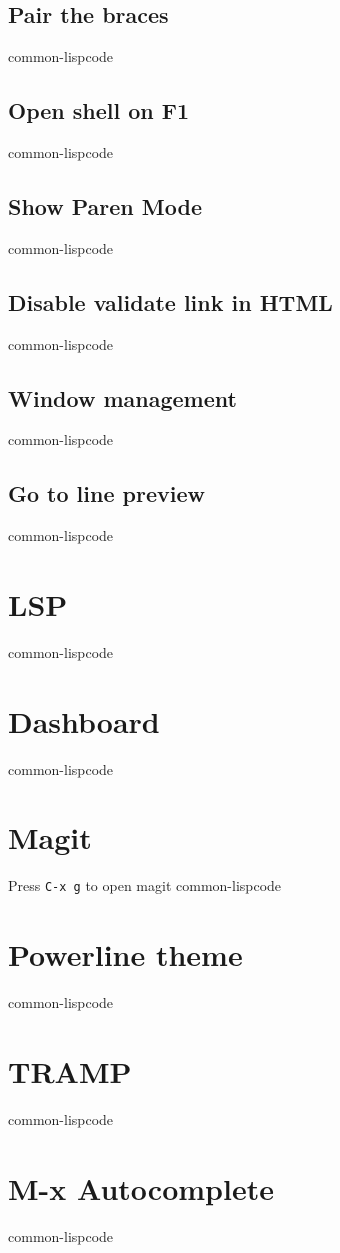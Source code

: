 \documentclass[11pt]{article}
\begin{document}
\subsection{Pair the braces}
\label{sec:orgb76506e}
common-lispcode
\subsection{Open shell on F1}
\label{sec:org9b2caaf}
common-lispcode
\subsection{Show Paren Mode}
\label{sec:orga960651}
common-lispcode
\subsection{Disable validate link in HTML}
\label{sec:org52f8f45}
common-lispcode
\subsection{Window management}
\label{sec:org8271c64}
common-lispcode
\subsection{Go to line preview}
\label{sec:org691fc3a}
common-lispcode
\section{LSP}
\label{sec:org68b0161}
common-lispcode
\section{Dashboard}
\label{sec:org02a0bb5}
common-lispcode
\section{Magit}
\label{sec:org823fa22}

Press \texttt{C-x g} to open magit
common-lispcode
\section{Powerline theme}
\label{sec:org7d1079b}
common-lispcode
\section{TRAMP}
\label{sec:orgd9e7e6f}
common-lispcode
\section{M-x Autocomplete}
\label{sec:orgb864b9b}
common-lispcode
\end{document}
